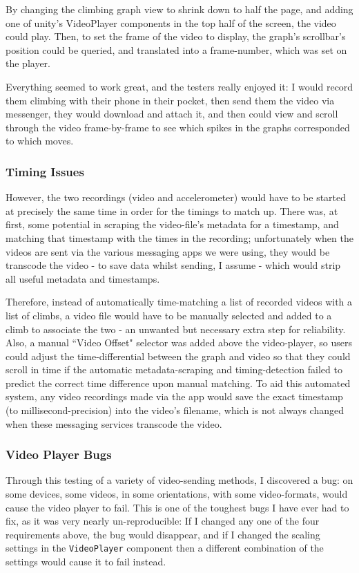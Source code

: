 By changing the climbing graph view to shrink down to half the page, and adding one of unity's VideoPlayer components in the top half of the screen, the video could play.
Then, to set the frame of the video to display, the graph's scrollbar's position could be queried, and translated into a frame-number, which was set on the player.

Everything seemed to work great, and the testers really enjoyed it:
I would record them climbing with their phone in their pocket, then send them the video via messenger, they would download and attach it, and then could view and scroll through the video frame-by-frame to see which spikes in the graphs corresponded to which moves.

\subsubsection{Timing Issues}
However, the two recordings (video and accelerometer) would have to be started at precisely the same time in order for the timings to match up.
There was, at first, some potential in scraping the video-file's metadata for a timestamp, and matching that timestamp with the times in the recording; unfortunately when the videos are sent via the various messaging apps we were using, they would be transcode the video - to save data whilst sending, I assume - which would strip all useful metadata and timestamps.

Therefore, instead of automatically time-matching a list of recorded videos with a list of climbs, a video file would have to be manually selected and added to a climb to associate the two - an unwanted but necessary extra step for reliability.
Also, a manual ``Video Offset" selector was added above the video-player, so users could adjust the time-differential between the graph and video so that they could scroll in time if the automatic metadata-scraping and timing-detection failed to predict the correct time difference upon manual matching.
To aid this automated system, any video recordings made via the app would save the exact timestamp (to millisecond-precision) into the video's filename, which is not always changed when these messaging services transcode the video.

\subsubsection{Video Player Bugs}
Through this testing of a variety of video-sending methods, I discovered a bug:
on some devices, some videos, in some orientations, with some video-formats, would cause the video player to fail.
This is one of the toughest bugs I have ever had to fix, as it was very nearly un-reproducible: If I changed any one of the four requirements above, the bug would disappear, and if I changed the scaling settings in the \verb|VideoPlayer| component then a different combination of the settings would cause it to fail instead.

